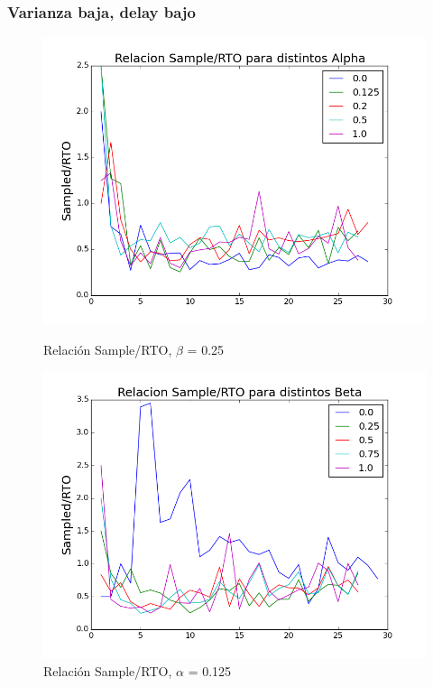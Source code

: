\subsubsection{Varianza baja, delay bajo}

\begin{figure}[H]
\begin{minipage}{0.5\linewidth}
\includegraphics[width=\linewidth]{../graficos/alphad01var2drop25.png}
\caption{Relación Sample/RTO, $\beta$ = 0.25}\label{fig:alpha-var2-drop25}
\end{minipage}
\hfill
\begin{minipage}{0.5\linewidth}
\includegraphics[width=\linewidth]{../graficos/betad01var2drop25.png}
\caption{Relación Sample/RTO, $\alpha$ = 0.125}\label{fig:beta-var2-drop25}
\end{minipage}
\end{figure}

